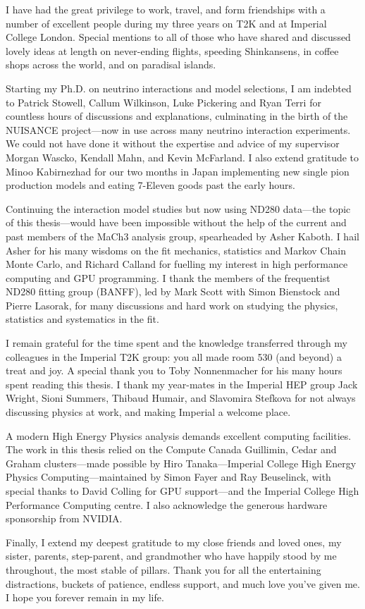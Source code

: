 \begin{acknowledgements}
	I have had the great privilege to work, travel, and form friendships with a number of excellent people during my three years on T2K and at Imperial College London. Special mentions to all of those who have shared and discussed lovely ideas at length on never-ending flights, speeding Shinkansens, in coffee shops across the world, and on paradisal islands.
	
	Starting my Ph.D. on neutrino interactions and model selections, I am indebted to Patrick Stowell, Callum Wilkinson, Luke Pickering and Ryan Terri for countless hours of discussions and explanations, culminating in the birth of the NUISANCE project\cite{NUISANCE}---now in use across many neutrino interaction experiments. We could not have done it without the expertise and advice of my supervisor Morgan Wascko, Kendall Mahn, and Kevin McFarland. I also extend gratitude to Minoo Kabirnezhad for our two months in Japan implementing new single pion production models and eating 7-Eleven goods past the early hours.
  
	Continuing the interaction model studies but now using ND280 data---the topic of this thesis---would have been impossible without the help of the current and past members of the MaCh3 analysis group, spearheaded by Asher Kaboth. I hail Asher for his many wisdoms on the fit mechanics, statistics and Markov Chain Monte Carlo, and Richard Calland for fuelling my interest in high performance computing and GPU programming. I thank the members of the frequentist ND280 fitting group (BANFF), led by Mark Scott with Simon Bienstock and Pierre Lasorak, for many discussions and hard work on studying the physics, statistics and systematics in the fit.
	
	I remain grateful for the time spent and the knowledge transferred through my colleagues in the Imperial T2K group: you all made room 530 (and beyond) a treat and joy. A special thank you to Toby Nonnenmacher for his many hours spent reading this thesis. I thank my year-mates in the Imperial HEP group Jack Wright, Sioni Summers, Thibaud Humair, and Slavomira Stefkova for not always discussing physics at work, and making Imperial a welcome place.
	
	A modern High Energy Physics analysis demands excellent computing facilities. The work in this thesis relied on the Compute Canada Guillimin, Cedar and Graham clusters---made possible by Hiro Tanaka---Imperial College High Energy Physics Computing---maintained by Simon Fayer and Ray Beuselinck, with special thanks to David Colling for GPU support---and the Imperial College High Performance Computing centre. I also acknowledge the generous hardware sponsorship from NVIDIA.
	
	Finally, I extend my deepest gratitude to my close friends and loved ones, my sister, parents, step-parent, and grandmother who have happily stood by me throughout, the most stable of pillars. Thank you for all the entertaining distractions, buckets of patience, endless support, and much love you've given me. I hope you forever remain in my life.
\end{acknowledgements}

\tableofcontents